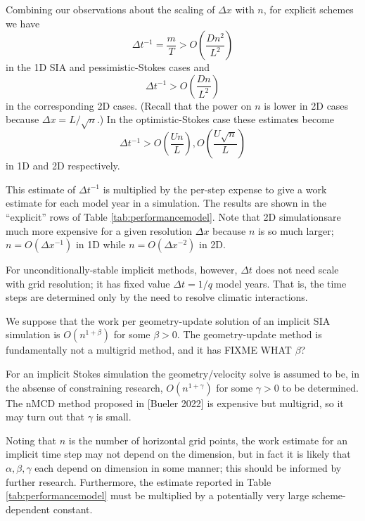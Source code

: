 \documentclass[twocolumn,letterpaper]{igs}
\begin{document}
Combining our observations about the scaling of $\Delta x$ with $n$, for explicit schemes we have
\begin{equation}
\Delta t^{-1} = \frac{m}{T} > O\left(\frac{D n^2}{L^2}\right)
\end{equation}
in the 1D SIA and pessimistic-Stokes cases and
\begin{equation}
\Delta t^{-1} > O\left(\frac{D n}{L^2}\right)
\end{equation}
in the corresponding 2D cases.  (Recall that the power on $n$ is lower in 2D cases because $\Delta x = L/\sqrt{n}$.)  In the optimistic-Stokes case these estimates become
\begin{equation}
\Delta t^{-1} > O\left(\frac{U n}{L}\right), O\left(\frac{U \sqrt{n}}{L}\right)
\end{equation}
in 1D and 2D respectively.

This estimate of $\Delta t^{-1}$ is multiplied by the per-step expense to give a work estimate for each model year in a simulation.  The results are shown in the ``explicit'' rows of Table \ref{tab:performancemodel}.  Note that 2D simulationsare much more expensive for a given resolution $\Delta x$ because $n$ is so much larger; $n = O(\Delta x^{-1})$ in 1D while $n = O(\Delta x^{-2})$ in 2D.

For unconditionally-stable implicit methods, however, $\Delta t$ does not need scale with grid resolution; it has fixed value $\Delta t = 1/q$ model years.  That is, the time steps are determined only by the need to resolve climatic interactions.

We suppose that the work per geometry-update solution of an implicit SIA simulation is $O(n^{1+\beta})$ for some $\beta>0$.  The \cite{Bueler2016} geometry-update method is fundamentally not a multigrid method, and it has FIXME WHAT $\beta$?

For an implicit Stokes simulation the geometry/velocity solve is assumed to be, in the absense of constraining research, $O(n^{1+\gamma})$ for some $\gamma>0$ to be determined.  The nMCD method proposed in [Bueler 2022] is expensive but multigrid, so it may turn out that $\gamma$ is small.

Noting that $n$ is the number of horizontal grid points, the work estimate for an implicit time step may not depend on the dimension, but in fact it is likely that $\alpha,\beta,\gamma$ each depend on dimension in some manner; this should be informed by further research.  Furthermore, the estimate reported in Table \ref{tab:performancemodel} must be multiplied by a potentially very large scheme-dependent constant.
\end{document}
